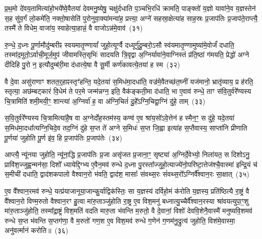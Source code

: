 प्र॒थ॒मो दे॑वय॒तामित्या॑हो॒भये᳚ष्वे॒वैतया॑ देवमनु॒ष्येषु॒ चक्षु॑र्दधाति प॒ञ्चभि॒रधि॑ क्रामति॒ पाङ्क्तो॑ य॒ज्ञो यावा॑ने॒व य॒ज्ञस्तेन॑ स॒ह सु॑व॒र्गं लो॒कमे॑ति॒ नक्तो॒षासेति॑ पुरोनुवा॒क्या॑मन्वा॑ह॒ प्रत्त्या॒ अग्ने॑ सहस्रा॒क्षेत्या॑ह साह॒स्रः प्र॒जा\-प॑तिः प्र॒जा\-प॑ते॒राप्त्यै॒ तस्मै॑ ते विधेम॒ वाजा॑य॒ स्वाहेत्या॒हान्नं॒ वै वाजो\-ऽन्न॑मे॒वाव॑~(३१)

रु॒न्धे॒ द॒ध्नः पू॒र्णामौदु॑म्बरीꣴ स्वयमातृ॒ण्णायां᳚ जुहो॒त्यूर्ग्वै दध्यूर्गु॑दु॒म्बरो॒\-ऽसौ स्व॑यमातृ॒ण्णामुष्या॑मे॒वोर्जं॑ दधाति॒ तस्मा॑द॒मुतो॒\-ऽर्वाची॒मूर्ज॒मुप॑ जीवामस्ति॒सृभिः॑ सादयति त्रि॒वृद्वा अ॒ग्निर्यावा॑ने॒वाग्निस्तं प्र॑ति॒ष्ठां ग॑मयति॒ प्रेद्धो॑ अग्ने दीदिहि पु॒रो न॒ इत्यौदुम्ब॑री॒मा द॑धात्ये॒षा वै सू॒र्मी कर्ण॑कावत्ये॒तया॑ ह स्म~(३२)

वै दे॒वा असु॑राणाꣳ शतत॒र्॒\mbox{}हाꣴस्तृꣳ॑हन्ति॒ यदे॒तया॑ स॒मिध॑मा॒दधा॑ति॒ वज्र॑मे॒वैतच्छ॑त॒घ्नीं यज॑मानो॒ भ्रातृ॑व्याय॒ प्र ह॑रति॒ स्तृत्या॒ अछ॑म्बट्कारं वि॒धेम॑ ते पर॒मे जन्म॑न्नग्न॒ इति॒ वैक॑ङ्कती॒मा द॑धाति॒ भा ए॒वाव॑ रुन्धे॒ ताꣳ स॑वि॒तुर्वरे᳚ण्यस्य चि॒त्रामिति॑ शमी॒मयी॒ꣳ॒ शान्त्या॑ अ॒ग्निर्वा॑ ह॒ वा अ॑ग्नि॒चितं॑ दु॒हे᳚\-ऽग्नि॒चिद्वा॒ग्निं दु॑हे॒ ताम्~(३३)

स॒वि॒तुर्वरे᳚ण्यस्य चि॒त्रामित्या॑है॒ष वा अ॒ग्नेर्दोह॒स्तम॑स्य॒ कण्व॑ ए॒व श्रा॑य॒सो॑\-ऽवे॒त्तेन॑ ह स्मैन॒ꣳ॒ स दु॑हे॒ यदे॒तया॑ स॒मिध॑मा॒दधा᳚त्यग्नि॒चिदे॒व तद॒ग्निं दु॑हे स॒प्त ते॑ अग्ने स॒मिधः॑ स॒प्त जि॒ह्वा इत्या॑ह स॒प्तैवास्य॒ साप्ता॑नि प्रीणाति पू॒र्णया॑ जुहोति पू॒र्ण इ॑व॒ हि प्र॒जा\-प॑तिः प्र॒जा\-प॑तेः~(३४)

आप्त्यै॒ न्यू॑नया जुहोति॒ न्यू॑ना॒द्धि प्र॒जा\-प॑तिः प्र॒जा असृ॑जत प्र॒जाना॒ꣳ॒ सृष्ट्या॑ अ॒ग्निर्दे॒वेभ्यो॒ निला॑यत॒ स दिशो\-ऽनु॒ प्रावि॑श॒ज्जुह्व॒न्मन॑सा॒ दिशो᳚ ध्यायेद्दि॒ग्भ्य ए॒वैन॒मव॑ रुन्धे द॒ध्ना पु॒रस्ता᳚ज्जुहो॒त्याज्ये॑नो॒परि॑ष्टा॒त्तेज॑श्चै॒वास्मा॑ इन्द्रि॒यं च॑ स॒मीची॑ दधाति॒ द्वाद॑श\-कपालो वैश्वान॒रो भ॑वति॒ द्वाद॑श॒ मासाः᳚ संवथ्स॒रः सं॑वथ्स॒रो᳚\-ऽग्निर्वै᳚श्वान॒रः सा॒क्षात्~(३५)

ए॒व वै᳚श्वान॒रमव॑ रुन्धे॒ यत्प्र॑याजानूया॒जान्कु॒र्याद्विक॑स्तिः॒ सा य॒ज्ञस्य॑ दर्विहो॒मं क॑रोति य॒ज्ञस्य॒ प्रति॑ष्ठित्यै रा॒ष्ट्रं वै वै᳚श्वान॒रो विण्म॒रुतो वैश्वान॒रꣳ हु॒त्वा मा॑रु॒ताञ्जु॑होति रा॒ष्ट्र ए॒व विश॒मनु॑ बध्नात्यु॒च्चैर्वै᳚श्वान॒रस्या श्रा॑वयत्युपा॒ꣳ॒शु मा॑रु॒ताञ्जु॑होति॒ तस्मा᳚द्रा॒ष्ट्रं विश॒मति॑ वदति मारु॒ता भ॑वन्ति म॒रुतो॒ वै दे॒वानां॒ विशो॑ देववि॒शेनै॒वास्मै॑ मनुष्यवि॒शमव॑ रुन्धे स॒प्त भ॑वन्ति स॒प्तग॑णा॒ वै म॒रुतो॑ गण॒श ए॒व विश॒मव॑ रुन्धे ग॒णेन॑ ग॒णम॑नु॒द्रुत्य॑ जुहोति॒ विश॑मे॒वास्मा॒ अनु॑वर्त्मानं करोति॥~(३६)

